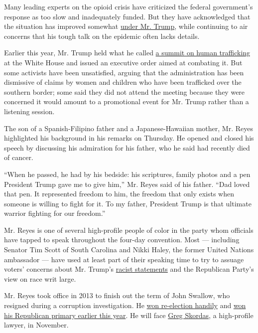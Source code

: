 Many leading experts on the opioid crisis have criticized the federal
government's response as too slow and inadequately funded. But they have
acknowledged that the situation has improved somewhat
\href{https://www.whitehouse.gov/opioids/}{under Mr. Trump}, while
continuing to air concerns that his tough talk on the epidemic often
lacks details.

Earlier this year, Mr. Trump held what he called
\href{https://www.nytimes3xbfgragh.onion/2020/01/31/us/politics/trump-trafficking.html}{a
summit on human trafficking} at the White House and issued an executive
order aimed at combating it. But some activists have been unsatisfied,
arguing that the administration has been dismissive of claims by women
and children who have been trafficked over the southern border; some
said they did not attend the meeting because they were concerned it
would amount to a promotional event for Mr. Trump rather than a
listening session.

The son of a Spanish-Filipino father and a Japanese-Hawaiian mother, Mr.
Reyes highlighted his background in his remarks on Thursday. He opened
and closed his speech by discussing his admiration for his father, who
he said had recently died of cancer.

``When he passed, he had by his bedside: his scriptures, family photos
and a pen President Trump gave me to give him,'' Mr. Reyes said of his
father. ``Dad loved that pen. It represented freedom to him, the freedom
that only exists when someone is willing to fight for it. To my father,
President Trump is that ultimate warrior fighting for our freedom.''

Mr. Reyes is one of several high-profile people of color in the party
whom officials have tapped to speak throughout the four-day convention.
Most --- including Senator Tim Scott of South Carolina and Nikki Haley,
the former United Nations ambassador --- have used at least part of
their speaking time to try to assuage voters' concerns about Mr. Trump's
\href{https://www.nytimes3xbfgragh.onion/2020/08/17/us/politics/trump-election.html}{racist
statements} and the Republican Party's view on race writ large.

Mr. Reyes took office in 2013 to finish out the term of John Swallow,
who resigned during a corruption investigation. He
\href{https://www.nytimes3xbfgragh.onion/elections/2016/results/utah-attorney-general}{won
re-election handily} and
\href{https://www.nytimes3xbfgragh.onion/interactive/2020/06/30/us/elections/results-utah-primary-elections.html}{won
his Republican primary earlier this year}. He will face
\href{https://www.sltrib.com/news/2020/03/17/utah-defense-attorney/}{Greg
Skordas}, a high-profile lawyer, in November.

